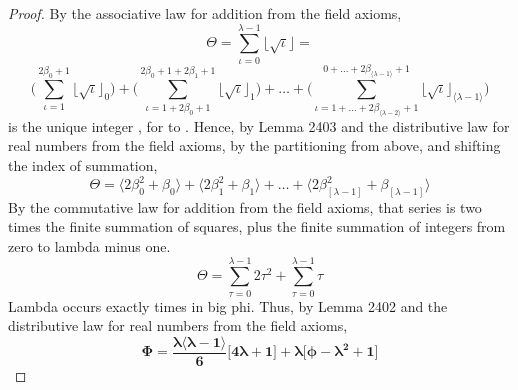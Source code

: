 \documentclass[preview]{standalone}
\begin{document}
\begin{proof}
    By the associative law for addition from the field axioms,
    \begin{equation*}
        \Theta
            = 
        \sum_{\iota=0}^{\lambda - 1} 
                \big \lfloor \sqrt \iota \big \rfloor 
            =
    \end{equation*}
    \begin{equation*}
        \Bigg (
            \sum_{\iota=1}^{ 2 \beta_0 + 1 } 
                    \big \lfloor \sqrt \iota \big \rfloor_0 
        \Bigg )
            +
        \Bigg (
            \sum_{\iota=1 + 2 \beta_0 + 1}^{ 2 \beta_0 + 1 + 2 \beta_1 + 1 } 
                    \big \lfloor \sqrt \iota \big \rfloor_1 
        \Bigg )
            +
        \dots
            +
        \Bigg (
            \sum_{\iota=1 +  \dots + 2 \beta_{\langle \lambda - 2 \rangle} + 1 }
                ^{0 + \dots + 2 \beta_{\langle \lambda - 1 \rangle} + 1} 
                    \big \lfloor \sqrt \iota \big \rfloor_{
                        \langle \lambda - 1 \rangle
                    } 
        \Bigg )
    \end{equation*}
    \bm{$\big \lfloor \sqrt \iota \big \rfloor_\tau$}
    is the unique integer \bm{$\beta_\tau$}, 
    for  to \bm{$\big \langle \lambda - 1 \big \rangle$}.
    Hence, by Lemma 2403 and the distributive law for real numbers from the field axioms, 
    by the partitioning from above, and shifting the index of summation,
    \begin{equation*}
        \Theta
            =
        \Big \langle 2 \beta_{0} ^2 + \beta_0 \Big \rangle
            +
        \Big \langle 2 \beta_{1} ^2 + \beta_1 \Big \rangle
            +
        \dots
            +
        \Big \langle 
            2 \beta_{[ \lambda - 1 ]} ^2
                +
            \beta_{[ \lambda - 1 ]}
        \Big \rangle
    \end{equation*}
    By the commutative law for addition from the field axioms,
    that series is two times the finite summation of squares, 
    plus the finite summation of integers from zero to lambda minus one.
    \begin{equation*}
        \Theta
            = 
        \sum_{\tau=0}^{ \lambda - 1 } 2 \tau ^2 
            +
        \sum_{\tau=0}^{ \lambda - 1 } \tau
    \end{equation*}
    Lambda occurs exactly 
    times in big phi.
    Thus, by Lemma 2402 and the distributive law for real numbers from the field axioms,
    \begin{equation*}
        \bm{
            \Phi
                =
            \frac{
                \lambda
                \big \langle \lambda - 1 \big \rangle
            }
            {6}
            \Bigg[
                4 \lambda + 1
            \Bigg]
                +
            \lambda
            \Bigg[
                \phi
                    -
                \lambda ^2
                    +
                1
            \Bigg]
        }
    \end{equation*}
\color{lightgray} \end{proof}
\end{document}
